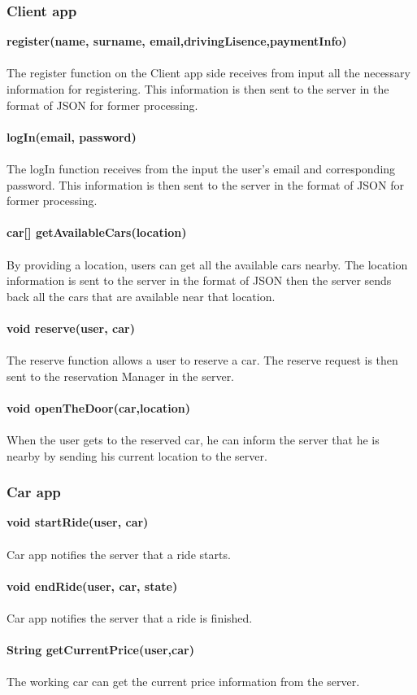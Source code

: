 \documentclass{article}
\begin{document}
	\subsubsection{Client app}
	\textbf{register(name, surname, email,drivingLisence,paymentInfo)}
	\\
	\\The register function on the Client app side receives from input all the necessary information for registering. This information is then sent to the server in the format of JSON for former processing.
	\\
	\\\textbf{logIn(email, password)}
	\\
	\\The logIn function receives from the input the user's email and corresponding password. This information is then sent to the server in the format of JSON for former processing. 
	\\
	\\\textbf{car[] getAvailableCars(location)}
	\\
	\\By providing a location, users can get all the available cars nearby. The location information is sent to the server in the format of JSON then the server sends back all the cars that are available near that location. 
	\\
	\\\textbf{void reserve(user, car)}
	\\
	\\The reserve function allows a user to reserve a car. The reserve request is then sent to the reservation Manager in the server.
	\\
	\\\textbf{void openTheDoor(car,location)}
	\\
	\\When the user gets to the reserved car, he can inform the server that he is nearby by sending his current location to the server. 
	
	\subsubsection{Car app}
	\textbf{void startRide(user, car)}
	\\
	\\Car app notifies the server that a ride starts.
	\\
	\\\textbf{void endRide(user, car, state)}
	\\
	\\Car app notifies the server that a ride is finished.
	\\
	\\\textbf{String getCurrentPrice(user,car)}
	\\
	\\The working car can get the current price information from the server.
\end{document}
